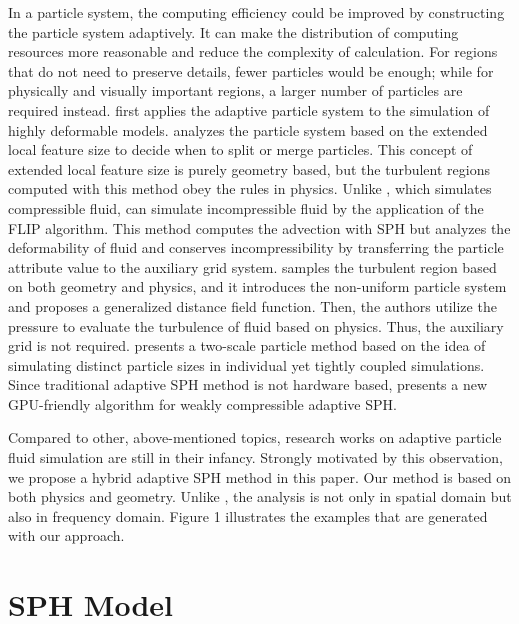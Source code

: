 In a particle system, the computing efficiency could be improved by
constructing the particle system adaptively. It can make the
distribution of computing resources more reasonable and reduce the
complexity of calculation. For regions that do not need to preserve
details, fewer particles would be enough; while for physically and
visually important regions, a larger number of particles are required
instead. \cite{Desbrun:1996:SPN:274976.274981} first applies the
adaptive particle system to the simulation of highly deformable
models. \cite{Adams:2007:ASP:1276377.1276437} analyzes the particle
system based on the extended local feature size to decide when to
split or merge particles. This concept of extended local feature size
is purely geometry based, but the turbulent regions computed with this
method obey the rules in physics. Unlike
\cite{Adams:2007:ASP:1276377.1276437}, which simulates compressible
fluid, \cite{Hong:2008:API:1394332.1394340} can simulate
incompressible fluid by the application of the FLIP
\cite{Zhu:2005:ASF:1073204.1073298} algorithm. This method computes
the advection with SPH but analyzes the deformability of fluid and
conserves incompressibility by transferring the particle attribute
value to the auxiliary grid system.
\cite{Yan:2009:RFS:1568678.1568695} samples the turbulent region based
on both geometry and physics, and it introduces the non-uniform
particle system and proposes a generalized distance field function.
Then, the authors utilize the pressure to evaluate the turbulence of
fluid based on physics. Thus, the auxiliary grid is not required.
\cite{Solenthaler:2011:TPS:2010324.1964976} presents a two-scale
particle method based on the idea of simulating distinct particle
sizes in individual yet tightly coupled simulations. Since traditional
adaptive SPH method is not hardware based, \cite{Zhang:2008:ZSP:12345}
presents a new GPU-friendly algorithm for weakly compressible adaptive
SPH.

Compared to other, above-mentioned topics, research works on adaptive
particle fluid simulation are still in their infancy. Strongly
motivated by this observation, we propose a hybrid adaptive SPH method
in this paper. Our method is based on both physics and geometry.
Unlike \cite{Hong:2008:API:1394332.1394340}, the analysis is not only
in spatial domain but also in frequency domain. Figure 1 illustrates
the examples that are generated with our approach.

\section{SPH Model}

